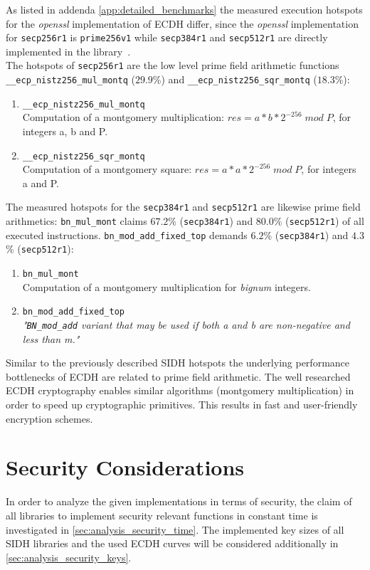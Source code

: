 As listed in addenda \ref{app:detailed_benchmarks} the measured execution hotspots for the \textit{openssl} implementation of ECDH differ, since the \textit{openssl} implementation for \texttt{secp256r1} is \texttt{prime256v1} while \texttt{secp384r1} and \texttt{secp512r1} are directly implemented in the library~\parencite{turner2009elliptic}.\\
The hotspots of \texttt{secp256r1} are the low level prime field arithmetic functions \texttt{\_\_ecp\_nistz256\_mul\_montq} ($29.9$\%) and \texttt{\_\_ecp\_nistz256\_sqr\_montq} ($18.3$\%):
\begin{enumerate}
\item \texttt{\_\_ecp\_nistz256\_mul\_montq}\\Computation of a montgomery multiplication: $res = a*b*2^{-256}\;mod\;P$, for integers a, b and P.
\item \texttt{\_\_ecp\_nistz256\_sqr\_montq} \\Computation of a montgomery square: $res = a*a*2^{-256}\;mod\;P$, for integers a and P.
\end{enumerate}
The measured hotspots for the \texttt{secp384r1} and \texttt{secp512r1} are likewise prime field arithmetics: \texttt{bn\_mul\_mont} claims $67.2$\% (\texttt{secp384r1}) and $80.0$\% (\texttt{secp512r1}) of all executed instructions. \texttt{bn\_mod\_add\_fixed\_top} demands $6.2$\% (\texttt{secp384r1}) and $4.3$\% (\texttt{secp512r1}):
\begin{enumerate}
\item \texttt{bn\_mul\_mont}\\Computation of a montgomery multiplication for \textit{bignum} integers.
\item \texttt{bn\_mod\_add\_fixed\_top}\\\textit{"\texttt{BN\_mod\_add} variant that may be used if both a and b are non-negative and less than m."}
\end{enumerate}
Similar to the previously described SIDH hotspots the underlying performance bottlenecks of ECDH are related to prime field arithmetic. The well researched ECDH cryptography enables similar  algorithms (montgomery multiplication) in order to speed up cryptographic primitives. This results in fast and user-friendly encryption schemes.
\section{Security Considerations}\label{sec:analysis_security}

In order to analyze the given implementations in terms of security, the claim of all libraries to implement security relevant functions in constant time is investigated in \autoref{sec:analysis_security_time}. The implemented key sizes of all SIDH libraries and the used ECDH curves will be considered additionally in \autoref{sec:analysis_security_keys}.

